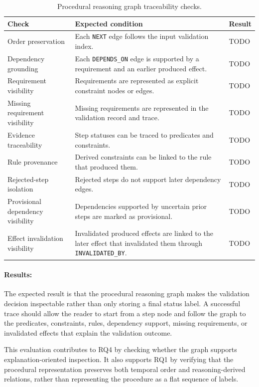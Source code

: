 \begin{table}[htbp]
\centering
\caption{Procedural reasoning graph traceability checks.}
\label{tab:evaluation-graph-traceability}
\begin{tabular}{p{} p{} p{}}
\toprule
Check & Expected condition & Result \\
\midrule
Order preservation & Each \texttt{NEXT} edge follows the input validation index. & TODO \\
Dependency grounding & Each \texttt{DEPENDS\_ON} edge is supported by a requirement and an earlier produced effect. & TODO \\
Requirement visibility & Requirements are represented as explicit constraint nodes or edges. & TODO \\
Missing requirement visibility & Missing requirements are represented in the validation record and trace. & TODO \\
Evidence traceability & Step statuses can be traced to predicates and constraints. & TODO \\
Rule provenance & Derived constraints can be linked to the rule that produced them. & TODO \\
Rejected-step isolation & Rejected steps do not support later dependency edges. & TODO \\
Provisional dependency visibility & Dependencies supported by uncertain prior steps are marked as provisional. & TODO \\
Effect invalidation visibility & Invalidated produced effects are linked to the later effect that invalidated them through \texttt{INVALIDATED\_BY}. & TODO \\
\bottomrule
\end{tabular}
\end{table}

\paragraph{Results:}
The expected result is that the procedural reasoning graph makes the validation
decision inspectable rather than only storing a final status label. A successful
trace should allow the reader to start from a step node and follow the graph to
the predicates, constraints, rules, dependency support, missing requirements, or
invalidated effects that explain the validation outcome.

This evaluation contributes to RQ4 by checking whether the graph supports
explanation-oriented inspection. It also supports RQ1 by verifying that the
procedural representation preserves both temporal order and reasoning-derived
relations, rather than representing the procedure as a flat sequence of labels.

